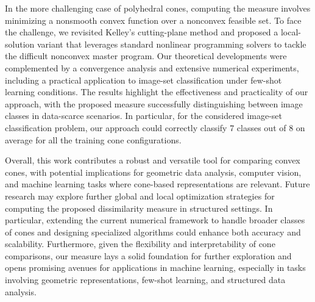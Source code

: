 \documentclass[hidelinks,onefignum,onetabnum]{siamart250211}
\theoremstyle{definition}
\theoremstyle{remark}
\begin{document}
In the more challenging case of polyhedral cones, computing the measure involves minimizing a nonsmooth convex function over a nonconvex feasible set. To face the challenge, we revisited Kelley’s cutting-plane method and proposed a local-solution variant that leverages standard nonlinear programming solvers to tackle the difficult nonconvex master program. 
Our theoretical developments were complemented by a convergence analysis and extensive numerical experiments, including a practical application to image-set classification under few-shot learning conditions. The results highlight the effectiveness and practicality of our approach, with the proposed measure successfully distinguishing between image classes in data-scarce scenarios. In particular, for the considered image-set classification problem, our approach could correctly classify
7 classes out of 8 on average for all the training cone configurations.

Overall, this work contributes a robust and versatile tool for comparing convex cones, with potential implications for geometric data analysis, computer vision, and machine learning tasks where cone-based representations are relevant. 
Future research may explore further global and local optimization strategies for computing the proposed dissimilarity measure in structured settings. In particular, extending the current numerical framework to handle broader classes of cones and designing specialized algorithms could enhance both accuracy and scalability. Furthermore, given the flexibility and interpretability of cone comparisons, our measure lays a solid foundation for further exploration and opens promising avenues for applications in machine learning, especially in tasks involving geometric representations, few-shot learning, and structured data analysis.
\end{document}
